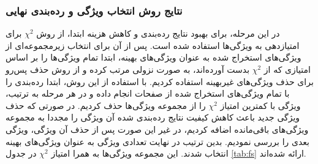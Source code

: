 \documentclass[twoside, a4paper,11pt]{book}
\numberwithin{equation}{chapter}
\numberwithin{table}{chapter}
\numberwithin{figure}{chapter}
\numberwithin{equation}{chapter}
\begin{document}
\subsubsection{نتایج روش انتخاب ویژگی و رده‌بندی نهایی}
\label{subsubsection:experiments-results-content-fsel}
در این مرحله، برای بهبود نتایج رده‌بندی و کاهش هزینه ابتدا، از روش  $\chi^2$ برای امتیازدهی به ویژگی‌ها استفاده شده است. پس از آن برای انتخاب زیرمجموعه‌ای از ویژگی‌های استخراج شده به عنوان ویژگی‌های بهینه، ابتدا تمام ویژگی‌ها را بر اساس امتیازی که از  $\chi^2$ بدست آورده‌اند، به صورت نزولی مرتب کرده و از روش حذف پس‌رو برای حذف ویژگی‌های غیربهینه استفاده کردیم. با استفاده از این روش، ابتدا رده‌بندی را با تمام ویژگی‌های استخراج شده از صفحات انجام داده و در هر مرحله به ترتیب، ویژگی با کمترین امتیاز  $\chi^2$ را از مجموعه ویژگی‌ها حذف کردیم. در صورتی که حذف ویژگی جدید باعث کاهش کیفیت نتایج رده‌بندی شده آن ویژگی را مجددا به مجموعه ویژگی‌های باقی‌مانده اضافه کردیم، در غیر این‌ صورت پس از حذف آن ویژگی، ویژگی بعدی را بررسی نمودیم. بدین ترتیب در نهایت تعدادی ویژگی به عنوان ویژگی‌های بهینه انتخاب شدند. این مجموعه ویژگی‌ها به همرا امتیاز  $\chi^2$ در جدول \ref{tab:fs} ارائه شده‌اند.
 
\end{document}
